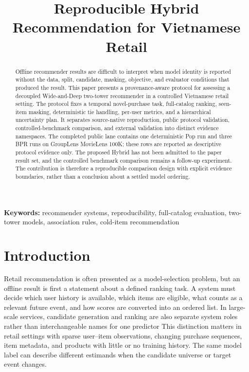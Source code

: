 \documentclass[10pt,a4paper]{article}
\title{Reproducible Hybrid Recommendation for Vietnamese Retail}
\author{}
\date{}
\begin{document}
\maketitle

\begin{abstract}
Offline recommender results are difficult to interpret when model identity is
reported without the data, split, candidate, masking, objective, and evaluator
conditions that produced the result. This paper presents a provenance-aware
protocol for assessing a decoupled Wide-and-Deep two-tower recommender in a
controlled Vietnamese retail setting. The protocol fixes a temporal
novel-purchase task, full-catalog ranking, seen-item masking, deterministic tie
handling, per-user metrics, and a hierarchical uncertainty plan. It separates
source-native reproduction, public protocol validation, controlled-benchmark
comparison, and external validation into distinct evidence namespaces. The
completed public lane contains one deterministic Pop run and three BPR runs on
GroupLens MovieLens 100K; these rows are reported as descriptive protocol
evidence only. The proposed Hybrid has not been admitted to the paper result
set, and the controlled benchmark comparison remains a follow-up experiment.
The contribution is therefore a reproducible comparison design with explicit
evidence boundaries, rather than a conclusion about a settled model ordering.
\end{abstract}

\noindent\textbf{Keywords:} recommender systems, reproducibility, full-catalog evaluation, two-tower models, association rules, cold-item recommendation


\section{Introduction}

Retail recommendation is often presented as a model-selection problem, but an
offline result is first a statement about a defined ranking task. A system must
decide which user history is available, which items are eligible, what counts as
a relevant future event, and how scores are converted into an ordered list. In
large-scale services, candidate generation and ranking are also separate system
roles rather than interchangeable names for one predictor
\cite{covington2016_youtube} %
\cite{yi2019_ndr} %
This distinction matters in retail settings with sparse user--item observations,
changing purchase sequences, item metadata, and products with little or no
training history. The same model label can describe different estimands when
the candidate universe or target event changes.
\end{document}
